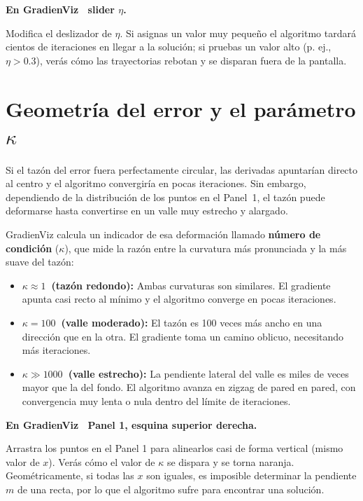 \documentclass[12pt, a4paper]{article}
\newenvironment{viznota}[1]{%
    \begin{mdframed}[style=vizverde]
    \textbf{\color{bordeteo}En GradienViz \textemdash\ #1.}\quad
}{%
    \end{mdframed}
}
\begin{document}
\begin{viznota}{slider $\eta$}
Modifica el deslizador de $\eta$. Si asignas un valor muy pequeño el algoritmo tardará cientos de iteraciones en llegar a la solución; si pruebas un valor alto (p. ej., $\eta > 0.3$), verás cómo las trayectorias rebotan y se disparan fuera de la pantalla.
\end{viznota}

\section{Geometría del error y el parámetro \texorpdfstring{$\kappa$}{kappa}}

Si el tazón del error fuera perfectamente circular, las derivadas apuntarían directo al centro y el algoritmo convergiría en pocas iteraciones. Sin embargo, dependiendo de la distribución de los puntos en el Panel~1, el tazón puede deformarse hasta convertirse en un valle muy estrecho y alargado.

GradienViz calcula un indicador de esa deformación llamado \textbf{número de condición} ($\kappa$), que mide la razón entre la curvatura más pronunciada y la más suave del tazón:

\begin{itemize}
    \item \textbf{$\kappa \approx 1$\ (tazón redondo):}
    Ambas curvaturas son similares. El gradiente apunta casi recto al mínimo
    y el algoritmo converge en pocas iteraciones.

    \item \textbf{$\kappa = 100$\ (valle moderado):}
    El tazón es 100 veces más ancho en una dirección que en la otra.
    El gradiente toma un camino oblicuo, necesitando más iteraciones.

    \item \textbf{$\kappa \gg 1000$\ (valle estrecho):}
    La pendiente lateral del valle es miles de veces mayor que la del fondo.
    El algoritmo avanza en zigzag de pared en pared, con convergencia muy lenta
    o nula dentro del límite de iteraciones.
\end{itemize}

\begin{viznota}{Panel 1, esquina superior derecha}
Arrastra los puntos en el Panel 1 para alinearlos casi de forma vertical (mismo valor de $x$). Verás cómo el valor de $\kappa$ se dispara y se torna naranja. Geométricamente, si todas las $x$ son iguales, es imposible determinar la pendiente $m$ de una recta, por lo que el algoritmo sufre para encontrar una solución.
\end{viznota}
\end{document}
